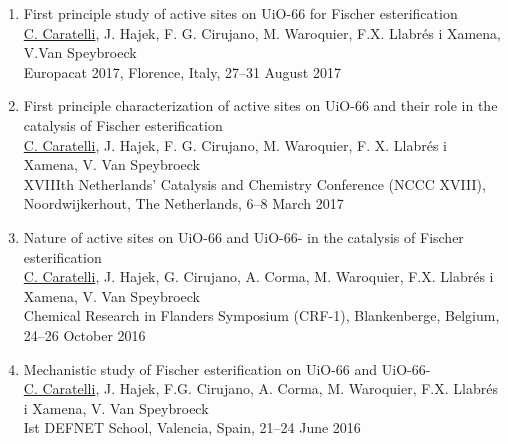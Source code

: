 \begin{enumerate}
\item
First principle study of active sites on UiO-66 for Fischer esterification\\
\underline{C. Caratelli}, J. Hajek, F. G. Cirujano, M. Waroquier, F.X. Llabr\'es i Xamena, V.Van Speybroeck\\
Europacat 2017, Florence, Italy, 27--31 August 2017

\item
First principle characterization of active sites on UiO-66 and their role in the
catalysis of Fischer esterification\\
\underline{C. Caratelli}, J. Hajek, F. G. Cirujano, M. Waroquier, F. X. Llabr\'es i Xamena, V. Van Speybroeck \\
XVIIIth Netherlands' Catalysis and Chemistry Conference (NCCC XVIII),
Noordwijkerhout, The Netherlands, 6--8 March 2017

\item 
Nature of active sites on UiO-66 and
UiO-66- in the catalysis of Fischer esterification\\
\underline{C. Caratelli}, J. Hajek, G. Cirujano, A. Corma, M. Waroquier, F.X.
Llabr\'es i Xamena, V. Van Speybroeck\\
Chemical Research in Flanders Symposium (CRF-1), Blankenberge, Belgium, 24--26
October 2016

\item
Mechanistic study of Fischer esterification on UiO-66 and UiO-66-\\
\underline{C. Caratelli}, J. Hajek, F.G. Cirujano, A. Corma, M. Waroquier, F.X.
Llabr\'es i Xamena, V. Van Speybroeck\\
Ist DEFNET School, Valencia, Spain, 21--24 June 2016
\end{enumerate}

